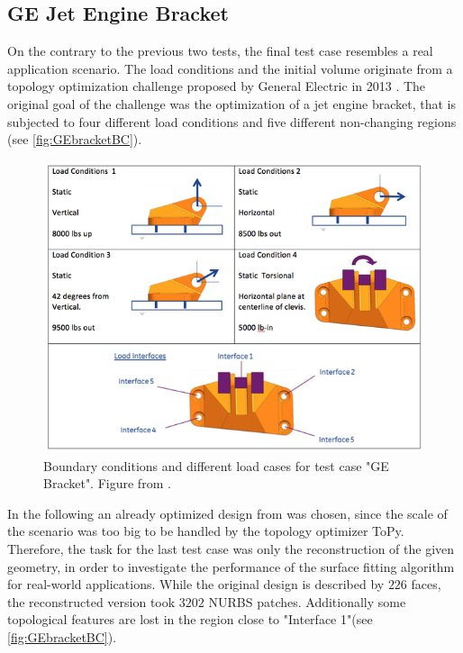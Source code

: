 \subsection{GE Jet Engine Bracket}
\label{ssec:bracket}
On the contrary to the previous two tests, the final test case resembles a real application scenario. The load conditions and the initial volume originate from a topology optimization challenge proposed by General Electric in 2013 \cite{GEBracket}. The original goal of the challenge was the optimization of a jet engine bracket, that is subjected to four different load conditions and five different non-changing regions (see \autoref{fig:GEbracketBC}).
\begin{figure}[H]
\begin{center}
\includegraphics[scale = 0.4]{Pictures/GEbracket.png}
\end{center}
\caption{Boundary conditions and different load cases for test case "GE Bracket". Figure from \cite{GEBracket}.}
\label{fig:GEbracketBC}
\end{figure}
In the following an already optimized design from \cite{GEBracketTripon} was chosen, since the scale of the scenario was too big to be handled by the topology optimizer ToPy. Therefore, the task for the last test case was only the reconstruction of the given geometry, in order to investigate the performance of the surface fitting algorithm for real-world applications. While the original design is described by $226$ faces, the reconstructed version took $3202$ NURBS patches. Additionally some topological features are lost in the region close to "Interface 1"(see \autoref{fig:GEbracketBC}).

